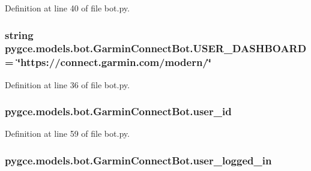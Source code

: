 Definition at line 40 of file bot.\+py.

\subsubsection[{\texorpdfstring{U\+S\+E\+R\+\_\+\+D\+A\+S\+H\+B\+O\+A\+RD}{USER_DASHBOARD}}]{\setlength{\rightskip}{0pt plus 5cm}string pygce.\+models.\+bot.\+Garmin\+Connect\+Bot.\+U\+S\+E\+R\+\_\+\+D\+A\+S\+H\+B\+O\+A\+RD = \char`\"{}https\+://connect.\+garmin.\+com/modern/\char`\"{}\hspace{0.3cm}{\ttfamily [static]}}\hypertarget{classpygce_1_1models_1_1bot_1_1_garmin_connect_bot_a4223a72025e44839acd9ebbdfca095da}{}\label{classpygce_1_1models_1_1bot_1_1_garmin_connect_bot_a4223a72025e44839acd9ebbdfca095da}


Definition at line 36 of file bot.\+py.

\subsubsection[{\texorpdfstring{user\+\_\+id}{user_id}}]{\setlength{\rightskip}{0pt plus 5cm}pygce.\+models.\+bot.\+Garmin\+Connect\+Bot.\+user\+\_\+id}\hypertarget{classpygce_1_1models_1_1bot_1_1_garmin_connect_bot_a762d018855af5616f0519e08c354a7c7}{}\label{classpygce_1_1models_1_1bot_1_1_garmin_connect_bot_a762d018855af5616f0519e08c354a7c7}


Definition at line 59 of file bot.\+py.

\subsubsection[{\texorpdfstring{user\+\_\+logged\+\_\+in}{user_logged_in}}]{\setlength{\rightskip}{0pt plus 5cm}pygce.\+models.\+bot.\+Garmin\+Connect\+Bot.\+user\+\_\+logged\+\_\+in}\hypertarget{classpygce_1_1models_1_1bot_1_1_garmin_connect_bot_ae6d646cac47d9930a50be37aad133dea}{}\label{classpygce_1_1models_1_1bot_1_1_garmin_connect_bot_ae6d646cac47d9930a50be37aad133dea}


